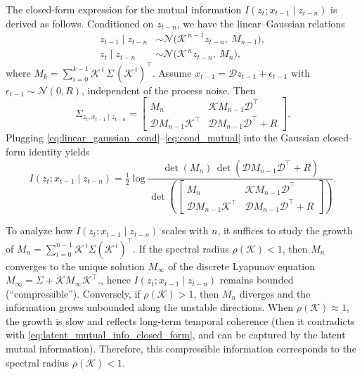 \documentclass{article} %
\begin{document}
\begin{proofwithframe}
The closed-form expression for the mutual information $I(z_t; x_{t-1} \mid z_{t-n})$ is derived as follows. 
Conditioned on $z_{t-n}$, we have the linear–Gaussian relations
\begin{equation}\label{eq:linear_gaussian_cond}
\begin{aligned}
    z_{t-1}\mid z_{t-n} &\sim \mathcal N\!\big(\mathcal K^{\,n-1} z_{t-n},\ M_{n-1}\big),\\
    z_t\mid z_{t-n}     &\sim \mathcal N\!\big(\mathcal K^{\,n}   z_{t-n},\ M_n\big),
\end{aligned}
\end{equation}
where $M_k = \sum_{i=0}^{k-1} \mathcal K^{\,i}\, \Sigma\, (\mathcal K^{\,i})^{\!\top}$.
Assume $x_{t-1} = \mathcal D z_{t-1} + \epsilon_{t-1}$ with $\epsilon_{t-1}\sim\mathcal N(0,R)$, independent of the process noise. Then
\begin{equation}\label{eq:cond_mutual}
    \Sigma_{z_t, x_{t-1}\mid z_{t-n}} =
    \begin{bmatrix}
        M_n & \mathcal K M_{n-1}\mathcal D^\top \\
        \mathcal D M_{n-1}\mathcal K^\top & \mathcal D M_{n-1}\mathcal D^\top + R
    \end{bmatrix}.
\end{equation}
Plugging \eqref{eq:linear_gaussian_cond}–\eqref{eq:cond_mutual} into the Gaussian closed-form identity yields
\begin{equation} \label{eq:closed_form_2}
    I(z_t; x_{t-1} \mid z_{t-n})
    = \tfrac{1}{2}\log
    \frac{ \det(M_n)\, \det(\mathcal D M_{n-1}\mathcal D^\top + R) }
         { \det\!\left(
           \begin{bmatrix}
           M_n & \mathcal K M_{n-1}\mathcal D^\top\\
           \mathcal D M_{n-1}\mathcal K^\top & \mathcal D M_{n-1}\mathcal D^\top + R
           \end{bmatrix}\right) }.
\end{equation}

To analyze how $I(z_t; x_{t-1}\mid z_{t-n})$ scales with $n$, it suffices to study the growth of
$M_n=\sum_{i=0}^{n-1}\mathcal K^{\,i}\Sigma(\mathcal K^{\,i})^{\!\top}$.
If the spectral radius $\rho(\mathcal K)<1$, then $M_n$ converges to the unique solution $M_\infty$ of the discrete Lyapunov equation
$M_\infty = \Sigma + \mathcal K M_\infty \mathcal K^\top.$, hence $I(z_t; x_{t-1}\mid z_{t-n})$ remains bounded (``compressible'').
Conversely, if $\rho(\mathcal K)>1$, then $M_n$ diverges and the information grows unbounded along the unstable directions.
When $\rho(\mathcal K)\approx 1$, the growth is slow and reflects long-term temporal coherence (then it contradicts with \eqref{eq:latent_mutual_info_closed_form}, and can be captured by the latent mutual information). Therefore, this compressible information corresponds to the spectral radius $\rho(\mathcal K)<1$.


\end{proofwithframe}
\end{document}
